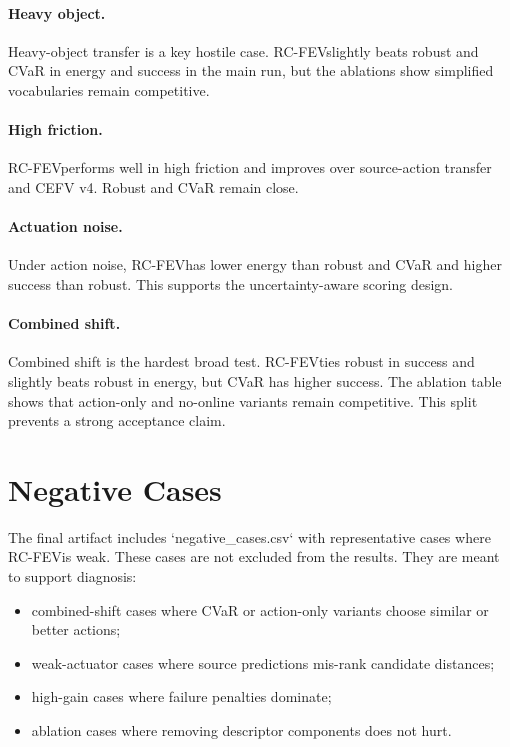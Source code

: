 \documentclass{article}
\newcommand{\method}{RC-FEV}
\begin{document}
\paragraph{Heavy object.}
Heavy-object transfer is a key hostile case. \method slightly beats robust and CVaR in energy and success in the main run, but the ablations show simplified vocabularies remain competitive.

\paragraph{High friction.}
\method performs well in high friction and improves over source-action transfer and CEFV v4. Robust and CVaR remain close.

\paragraph{Actuation noise.}
Under action noise, \method has lower energy than robust and CVaR and higher success than robust. This supports the uncertainty-aware scoring design.

\paragraph{Combined shift.}
Combined shift is the hardest broad test. \method ties robust in success and slightly beats robust in energy, but CVaR has higher success. The ablation table shows that action-only and no-online variants remain competitive. This split prevents a strong acceptance claim.

\section{Negative Cases}

The final artifact includes `negative\_cases.csv` with representative cases where \method is weak. These cases are not excluded from the results. They are meant to support diagnosis:

\begin{itemize}
\item combined-shift cases where CVaR or action-only variants choose similar or better actions;
\item weak-actuator cases where source predictions mis-rank candidate distances;
\item high-gain cases where failure penalties dominate;
\item ablation cases where removing descriptor components does not hurt.
\end{itemize}
\end{document}

